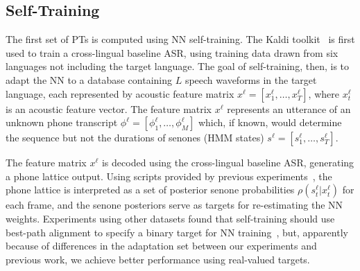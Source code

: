 \subsection{Self-Training}
\label{sec:selftraining}

The first set of PTs is computed using NN self-training.
The Kaldi toolkit~\cite{Kaldi2011} is first used to train a
cross-lingual baseline ASR, using training data drawn from six
languages not including the target language.  The goal of
self-training, then, is to adapt the NN to a database containing
$L$ speech waveforms in the target language, each represented by
acoustic feature matrix $x^\ell =[x_1^\ell,\ldots,x_T^\ell]$, where
$x_t^\ell$ is an acoustic feature vector.  The feature matrix $x^\ell$
represents an utterance of an unknown phone transcript
$\phi^\ell=[\phi_1^\ell,\ldots,\phi_M^\ell]$ which, if known, would
determine the sequence but not the durations of senones (HMM states)
$s^\ell =[s_1^\ell,\ldots,s_T^\ell]$.

The feature matrix $x^\ell$ is decoded using the cross-lingual
baseline ASR, generating a phone lattice output.  Using scripts
provided by previous experiments~\cite{vesely2013-semi}, the phone
lattice is interpreted as a set of posterior senone probabilities
$\rho(s_t^\ell|x_t^\ell)$ for each frame, and the senone posteriors
serve as targets for re-estimating the NN weights.
Experiments using other datasets found that self-training
should use best-path alignment to specify a binary target for NN
training~\cite{vesely2013-semi}, but, apparently because of
differences in the adaptation set between our experiments and previous
work, we achieve better performance using real-valued targets.
